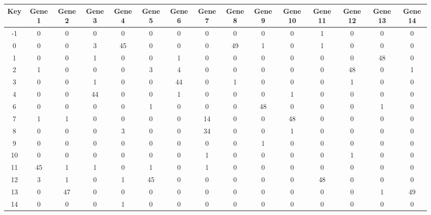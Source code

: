 \begin{tabular}{|c|c|c|c|c|c|c|c|c|c|c|c|c|c|c|}
\hline
Key & Gene 1 & Gene 2 & Gene 3 & Gene 4 & Gene 5 & Gene 6 & Gene 7 & Gene 8 & Gene 9 & Gene 10 & Gene 11 & Gene 12 & Gene 13 & Gene 14 \\
\hline
-1 & 0 & 0 & 0 & 0 & 0 & 0 & 0 & 0 & 0 & 0 & 1 & 0 & 0 & 0 \\
0 & 0 & 0 & 3 & 45 & 0 & 0 & 0 & 49 & 1 & 0 & 1 & 0 & 0 & 0 \\
1 & 0 & 0 & 1 & 0 & 0 & 1 & 0 & 0 & 0 & 0 & 0 & 0 & 48 & 0 \\
2 & 1 & 0 & 0 & 0 & 3 & 4 & 0 & 0 & 0 & 0 & 0 & 48 & 0 & 1 \\
3 & 0 & 0 & 1 & 0 & 0 & 44 & 0 & 1 & 0 & 0 & 0 & 1 & 0 & 0 \\
4 & 0 & 0 & 44 & 0 & 0 & 1 & 0 & 0 & 0 & 1 & 0 & 0 & 0 & 0 \\
6 & 0 & 0 & 0 & 0 & 1 & 0 & 0 & 0 & 48 & 0 & 0 & 0 & 1 & 0 \\
7 & 1 & 1 & 0 & 0 & 0 & 0 & 14 & 0 & 0 & 48 & 0 & 0 & 0 & 0 \\
8 & 0 & 0 & 0 & 3 & 0 & 0 & 34 & 0 & 0 & 1 & 0 & 0 & 0 & 0 \\
9 & 0 & 0 & 0 & 0 & 0 & 0 & 0 & 0 & 1 & 0 & 0 & 0 & 0 & 0 \\
10 & 0 & 0 & 0 & 0 & 0 & 0 & 1 & 0 & 0 & 0 & 0 & 1 & 0 & 0 \\
11 & 45 & 1 & 1 & 0 & 1 & 0 & 1 & 0 & 0 & 0 & 0 & 0 & 0 & 0 \\
12 & 3 & 1 & 0 & 1 & 45 & 0 & 0 & 0 & 0 & 0 & 48 & 0 & 0 & 0 \\
13 & 0 & 47 & 0 & 0 & 0 & 0 & 0 & 0 & 0 & 0 & 0 & 0 & 1 & 49 \\
14 & 0 & 0 & 0 & 1 & 0 & 0 & 0 & 0 & 0 & 0 & 0 & 0 & 0 & 0 \\
\hline
\end{tabular}
